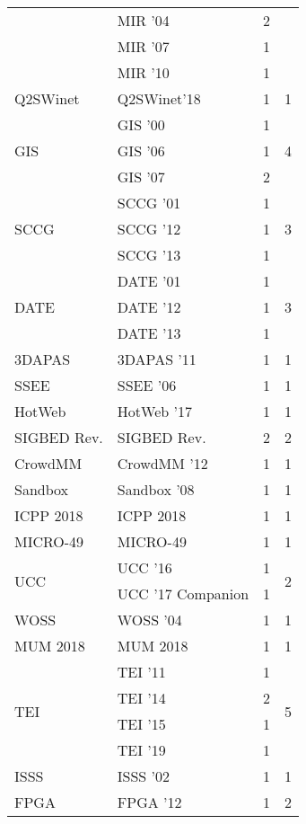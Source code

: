 \begin{table*}[t]
\begin{tabular}{llrr}
& MIR '04 & 2 &\\
& MIR '07 & 1 &\\
& MIR '10 & 1 &\\
\multirow{1}{*}{Q2SWinet} & Q2SWinet'18 & 1 & \multirow{1}{*}{1}\\
\multirow{3}{*}{GIS } & GIS '00 & 1 & \multirow{3}{*}{4}\\
& GIS '06 & 1 &\\
& GIS '07 & 2 &\\
\multirow{3}{*}{SCCG } & SCCG '01 & 1 & \multirow{3}{*}{3}\\
& SCCG '12 & 1 &\\
& SCCG '13 & 1 &\\
\multirow{3}{*}{DATE } & DATE '01 & 1 & \multirow{3}{*}{3}\\
& DATE '12 & 1 &\\
& DATE '13 & 1 &\\
\multirow{1}{*}{3DAPAS } & 3DAPAS '11 & 1 & \multirow{1}{*}{1}\\
\multirow{1}{*}{SSEE } & SSEE '06 & 1 & \multirow{1}{*}{1}\\
\multirow{1}{*}{HotWeb } & HotWeb '17 & 1 & \multirow{1}{*}{1}\\
\multirow{1}{*}{SIGBED Rev.} & SIGBED Rev. & 2 & \multirow{1}{*}{2}\\
\multirow{1}{*}{CrowdMM } & CrowdMM '12 & 1 & \multirow{1}{*}{1}\\
\multirow{1}{*}{Sandbox } & Sandbox '08 & 1 & \multirow{1}{*}{1}\\
\multirow{1}{*}{ICPP 2018} & ICPP 2018 & 1 & \multirow{1}{*}{1}\\
\multirow{1}{*}{MICRO-49} & MICRO-49 & 1 & \multirow{1}{*}{1}\\
\multirow{2}{*}{UCC } & UCC '16 & 1 & \multirow{2}{*}{2}\\
& UCC '17 Companion & 1 &\\
\multirow{1}{*}{WOSS } & WOSS '04 & 1 & \multirow{1}{*}{1}\\
\multirow{1}{*}{MUM 2018} & MUM 2018 & 1 & \multirow{1}{*}{1}\\
\multirow{4}{*}{TEI } & TEI '11 & 1 & \multirow{4}{*}{5}\\
& TEI '14 & 2 &\\
& TEI '15 & 1 &\\
& TEI '19 & 1 &\\
\multirow{1}{*}{ISSS } & ISSS '02 & 1 & \multirow{1}{*}{1}\\
\multirow{2}{*}{FPGA } & FPGA '12 & 1 & \multirow{2}{*}{2}\\

\end{tabular}
\end{table*}
